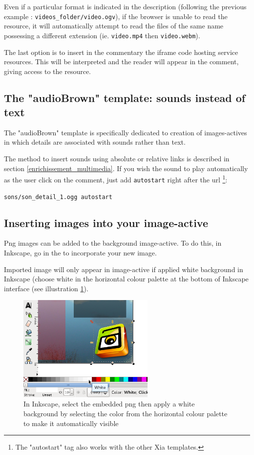 Even if a particular format is indicated in the description (following 
the previous example : \verb|videos_folder/video.ogv|), if the browser is 
unable to read the resource, it will automatically attempt to read the files 
of the same name possessing a different extension (ie. \verb|video.mp4| 
then \verb|video.webm|).

The last option is to insert in the commentary the iframe code hosting service 
resources. This will be interpreted and the reader will appear in the comment, 
giving access to the resource.

\subsection{The "audioBrown" template: sounds instead of text}

The "audioBrown" template is specifically dedicated to creation of 
images-actives in which details are associated with sounds rather than text.

The method to insert sounds using absolute or relative links is described in 
section 
\ref{enrichissement_multimedia}. If you wish the sound to play 
automatically as the user click on the comment, just add \verb|autostart| right 
after the url \footnote{The "autostart" tag also works with the other 
Xia templates.}:\\
\begin{center}
 \verb|sons/son_detail_1.ogg autostart|
\end{center}


\subsection{Inserting images into your image-active}\label{insertion_images}

Png images can be added to the background image-active. To do this, in 
Inkscape, go in the  to incorporate your new image.

Imported image will only appear in image-active if applied white background in 
Inkscape (choose white in the horizontal colour palette at the bottom of 
Inkscape interface (see illustration \ref{remplissage_blanc}).

\begin{figure}[htp!]
 \centering\includegraphics[width=0.6\textwidth] {images/remplissage_blanc}
 \caption{In Inkscape, select the embedded png then apply a white background 
 by selecting the color from the horizontal colour palette to make it 
 automatically visible} 
 \label{remplissage_blanc}
\end{figure}

